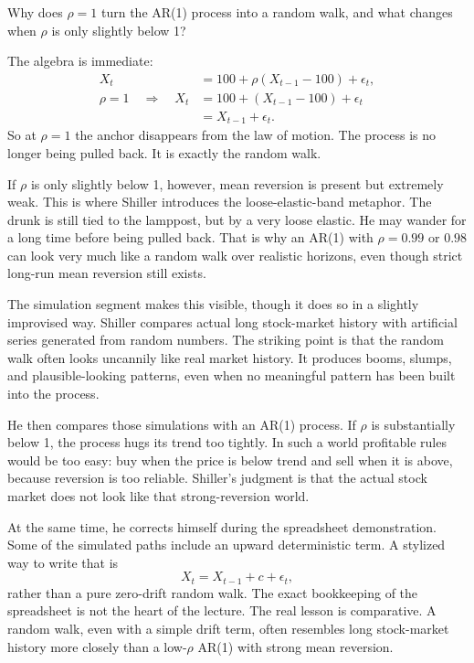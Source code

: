 Why does \(\rho=1\) turn the AR(1) process into a random walk, and what changes when \(\rho\) is only slightly below 1?

The algebra is immediate:
\begin{align}
X_t &= 100 + \rho(X_{t-1}-100) + \epsilon_t, \\
\rho=1 \quad \Longrightarrow \quad
X_t &= 100 + (X_{t-1}-100) + \epsilon_t \\
&= X_{t-1} + \epsilon_t.
\end{align}
So at \(\rho=1\) the anchor disappears from the law of motion. The process is no longer being pulled back. It is exactly the random walk.

If \(\rho\) is only slightly below 1, however, mean reversion is present but extremely weak. This is where Shiller introduces the loose-elastic-band metaphor. The drunk is still tied to the lamppost, but by a very loose elastic. He may wander for a long time before being pulled back. That is why an AR(1) with \(\rho=0.99\) or \(0.98\) can look very much like a random walk over realistic horizons, even though strict long-run mean reversion still exists.

The simulation segment makes this visible, though it does so in a slightly improvised way. Shiller compares actual long stock-market history with artificial series generated from random numbers. The striking point is that the random walk often looks uncannily like real market history. It produces booms, slumps, and plausible-looking patterns, even when no meaningful pattern has been built into the process.

He then compares those simulations with an AR(1) process. If \(\rho\) is substantially below 1, the process hugs its trend too tightly. In such a world profitable rules would be too easy: buy when the price is below trend and sell when it is above, because reversion is too reliable. Shiller's judgment is that the actual stock market does not look like that strong-reversion world.

At the same time, he corrects himself during the spreadsheet demonstration. Some of the simulated paths include an upward deterministic term. A stylized way to write that is
\begin{equation}
X_t = X_{t-1} + c + \epsilon_t,
\end{equation}
rather than a pure zero-drift random walk. The exact bookkeeping of the spreadsheet is not the heart of the lecture. The real lesson is comparative. A random walk, even with a simple drift term, often resembles long stock-market history more closely than a low-\(\rho\) AR(1) with strong mean reversion.


